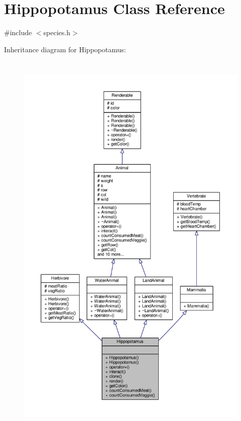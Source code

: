 \hypertarget{classHippopotamus}{}\section{Hippopotamus Class Reference}
\label{classHippopotamus}


{\ttfamily \#include $<$species.\+h$>$}



Inheritance diagram for Hippopotamus\+:
\nopagebreak
\begin{figure}[H]
\begin{center}
\leavevmode
\includegraphics[height=550pt]{classHippopotamus__inherit__graph}
\end{center}
\end{figure}


